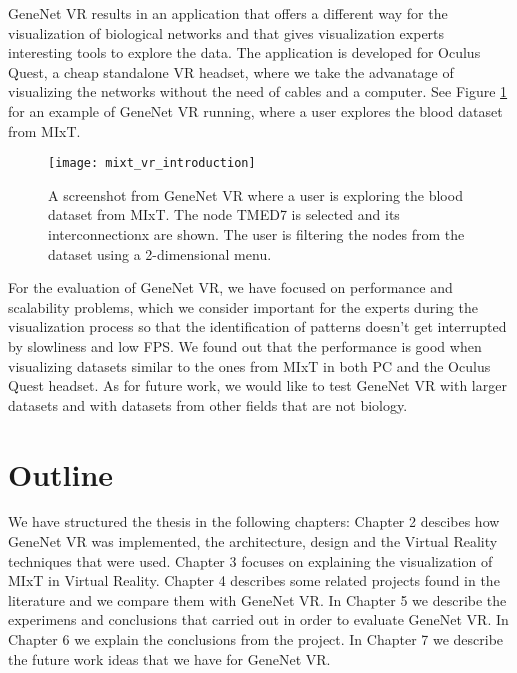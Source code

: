 GeneNet VR results in an application that offers a different way for the visualization of biological networks and that gives visualization experts interesting tools to explore the data. The application is developed for Oculus Quest, a cheap standalone VR headset, where we take the advanatage of visualizing the networks without the need of cables and a computer. See Figure \ref{fig:bignet_intro} for an example of GeneNet VR running, where a user explores the blood dataset from MIxT.

\begin{figure}[h!]
    \setlength{\tempheight}{15ex}
    \centering
    \texttt{[image: mixt\_vr\_introduction]}
    \caption{A screenshot from GeneNet VR where a user is exploring the blood dataset from MIxT. The node TMED7 is selected and its interconnectionx are shown. The user is filtering the nodes from the dataset using a 2-dimensional menu.}
    \label{fig:bignet_intro}
\end{figure}

For the evaluation of GeneNet VR, we have focused on performance and scalability problems, which we consider important for the experts during the visualization process so that the identification of patterns doesn't get interrupted by slowliness and low FPS. We found out that the performance is good when visualizing datasets similar to the ones from MIxT in both PC and the Oculus Quest headset. As for future work, we would like to test GeneNet VR with larger datasets and with datasets from other fields that are not biology.

\section{Outline}

We have structured the thesis in the following chapters: Chapter 2 descibes how GeneNet VR was implemented, the architecture, design and the Virtual Reality techniques that were used. Chapter 3 focuses on explaining the visualization of MIxT in Virtual Reality. Chapter 4 describes some related projects found in the literature and we compare them with GeneNet VR. In Chapter 5 we describe the experimens and conclusions that carried out in order to evaluate GeneNet VR. In Chapter 6 we explain the conclusions from the project. In Chapter 7 we describe the future work ideas that we have for GeneNet VR.
